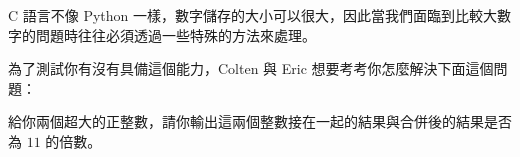 C 語言不像 Python 一樣，數字儲存的大小可以很大，因此當我們面臨到比較大數字的問題時往往必須透過一些特殊的方法來處理。

為了測試你有沒有具備這個能力，Colten 與 Eric 想要考考你怎麼解決下面這個問題：

給你兩個超大的正整數，請你輸出這兩個整數接在一起的結果與合併後的結果是否為 $11$ 的倍數。
